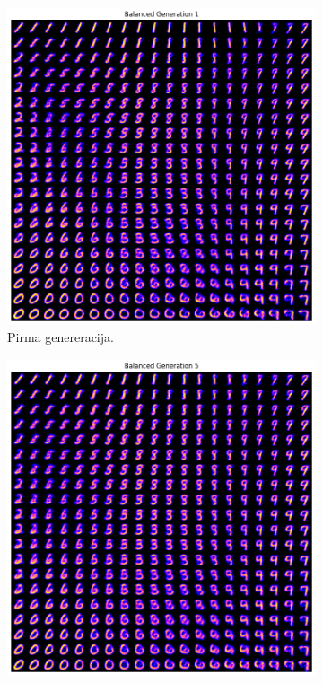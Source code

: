 \documentclass{VUMIFInfKursinis}
\begin{document}
\begin{figure}[H]
    \centering
    \begin{subfigure}[t]{0.45\textwidth} %
        \centering
        \includegraphics[scale=0.40]{img/real_synthetic_generation_1.png}
        \caption{Pirma genereracija.}
        \label{img:image1}
    \end{subfigure}
    \hfill %
    \begin{subfigure}[t]{0.45\textwidth} %
        \centering
        \includegraphics[scale=0.40]{img/real_synthetic_generation_5.png}

\end{subfigure}
\end{figure}
\end{document}
